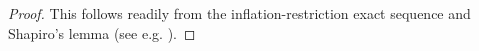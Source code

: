 \documentclass[a4paper,10pt]{amsart}
\numberwithin{equation}{section}
\numberwithin{equation}{section}
\theoremstyle{plain}
\theoremstyle{definition}
\theoremstyle{definition}
\theoremstyle{plain}
\newtheorem{prop}[thm]{Proposition}
\theoremstyle{plain}
\theoremstyle{plain}
\theoremstyle{plain}
\DeclareMathOperator{\ord}{ord}
\newcommand{\Q}{\mathbb{Q}}
\newcommand{\X}{\mathfrak{X}}
\newcommand{\Fcal}{\mathcal{F}}
\newcommand{\rH}{\mathrm{H}}
\begin{document}
\begin{proof}
This follows readily from the inflation-restriction exact sequence and Shapiro's lemma (see e.g. \cite[Lem.\,3.6]{skinner-urban}).
%
\end{proof}






\end{document}

